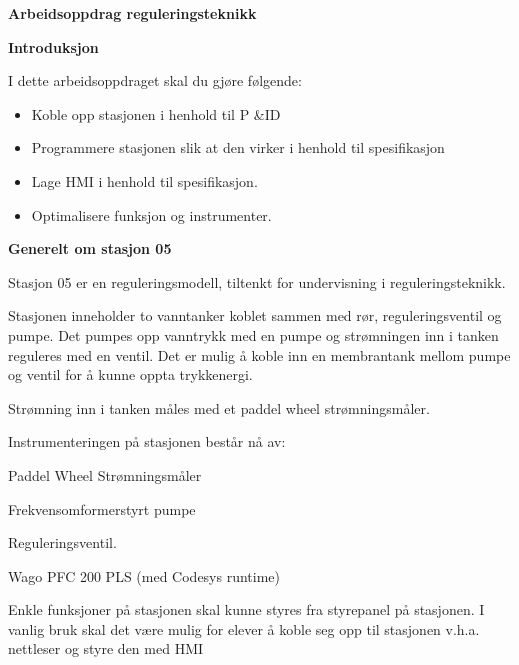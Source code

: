 

\noindent

\vskip 5pt



\vskip 5pt
\begin{center}
\textbf{Arbeidsoppdrag reguleringsteknikk}
\vskip 5pt 
\vskip 5pt 
\end{center}

\vskip 10pt 
\textbf{Introduksjon}

\vskip 5pt 
I dette arbeidsoppdraget skal du gjøre følgende:
\begin{itemize}[noitemsep]
	\item Koble opp stasjonen i henhold til P \&ID
	\item Programmere stasjonen slik at den virker i henhold til spesifikasjon
	\item Lage HMI i henhold til spesifikasjon. 
	\item Optimalisere funksjon og instrumenter. 
\end{itemize}

\textbf{Generelt om stasjon 05}

Stasjon 05 er en reguleringsmodell, tiltenkt for undervisning i reguleringsteknikk.  

Stasjonen inneholder to vanntanker koblet sammen med rør, reguleringsventil og pumpe. Det pumpes opp vanntrykk med en pumpe og strømningen inn i tanken reguleres med en ventil. Det er mulig å koble inn en membrantank mellom pumpe og ventil for å kunne oppta trykkenergi.  

Strømning inn i tanken måles med et paddel wheel strømningsmåler.   

Instrumenteringen på stasjonen består nå av:  

Paddel Wheel Strømningsmåler 

Frekvensomformerstyrt pumpe 

Reguleringsventil. 

Wago PFC 200 PLS (med Codesys runtime) 


Enkle funksjoner på stasjonen skal kunne styres fra styrepanel på stasjonen. I vanlig bruk skal det være mulig for elever å koble seg opp til stasjonen v.h.a. nettleser og styre den med HMI



